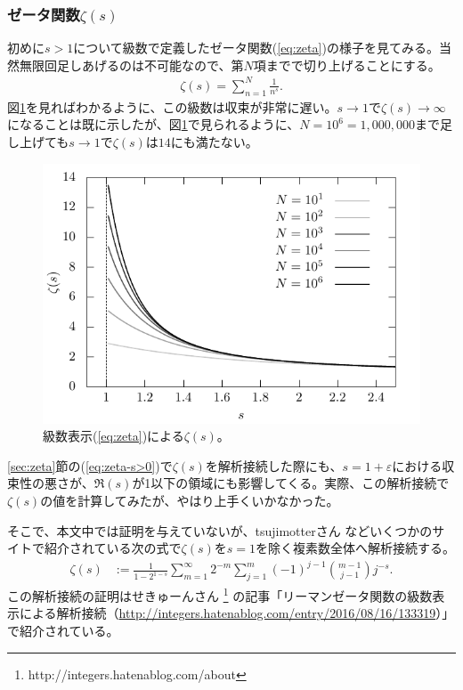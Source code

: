 \documentclass[11pt,b5paper,papersize,dvipdfmx]{jsbook}
\begin{document}
\subsubsection{ゼータ関数$\zeta(s)$}
初めに$s>1$について級数で定義したゼータ関数(\ref{eq:zeta})の様子を見てみる。当然無限回足しあげるのは不可能なので、第$N$項までで切り上げることにする。
\begin{align*}
  \zeta(s) = \sum_{n=1}^N\frac1{n^s}.
\end{align*}
図\ref{fig:lt1-zeta}を見ればわかるように、この級数は収束が非常に遅い。$s\to1$で$\zeta(s)\to\infty$になることは既に示したが、図\ref{fig:lt1-zeta}で見られるように、$N=10^6=1,000,000$まで足し上げても$s\to1$で$\zeta(s)$は$14$にも満たない。
%
\begin{figure}[H]
  \centering
  \includegraphics{nkym/gnuplot/zeta/lt1-main}
  \caption{級数表示(\ref{eq:zeta})による$\zeta(s)$。}
  \label{fig:lt1-zeta}
\end{figure}
%
\ref{sec:zeta}節の(\ref{eq:zeta-s>0})で$\zeta(s)$を解析接続した際にも、$s= 1+\varepsilon$における収束性の悪さが、$\Re(s)$が1以下の領域にも影響してくる。実際、この解析接続で$\zeta(s)$の値を計算してみたが、やはり上手くいかなかった。\par
そこで、本文中では証明を与えていないが、tsujimotterさん
などいくつかのサイトで紹介されている次の式で$\zeta(s)$を$s=1$を除く複素数全体へ解析接続する。
\begin{align}
  \zeta(s) &:= \frac{1}{1 - 2^{1-s}} \sum_{m=1}^\infty 2^{-m} \sum_{j=1}^m (-1)^{j-1} \binom{m-1}{j-1}j^{-s}.
  \label{eq:zeta-tsujimoter}
\end{align}
この解析接続の証明はせきゅーんさん
\footnote{http://integers.hatenablog.com/about}
の記事「リーマンゼータ関数の級数表示による解析接続（\url{http://integers.hatenablog.com/entry/2016/08/16/133319}）」で紹介されている。
\end{document}
